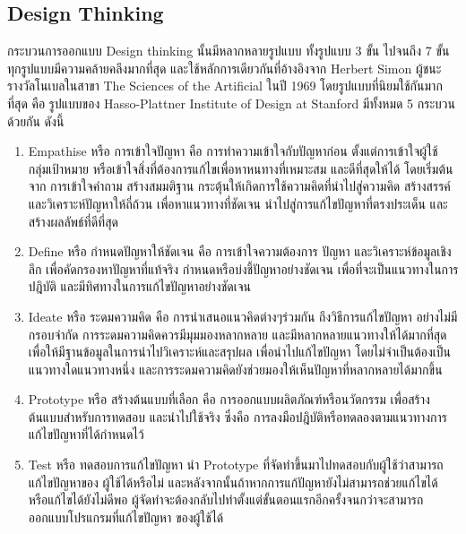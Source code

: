 \subsection{Design Thinking}
กระบวนการออกแบบ Design thinking นั้นมีหลากหลายรูปแบบ ทั้งรูปแบบ 3 ขั้น ไปจนถึง 7 ขั้น ทุกรูปแบบมีความคล้ายคลึงมากที่สุด และใช้หลักการเดียวกันที่อ้างอิงจาก Herbert Simon ผู้ชนะรางวัลโนเบลในสาขา The Sciences of the Artificial ในปี 1969 โดยรูปแบบที่นิยมใช้กันมากที่สุด คือ รูปแบบของ Hasso-Plattner Institute of Design at Stanford มีทั้งหมด 5 กระบวนด้วยกัน ดังนี้
\begin{enumerate}
    \item Empathise หรือ การเข้าใจปัญหา
          คือ การทำความเข้าใจกับปัญหาก่อน ตั้งแต่การเข้าใจผู้ใช้ กลุ่มเป้าหมาย หรือเข้าใจสิ่งที่ต้องการแก้ไขเพื่อหาหนทางที่เหมาะสม และดีที่สุดให้ได้ โดยเริ่มต้นจาก การเข้าใจคำถาม สร้างสมมติฐาน กระตุ้นให้เกิดการใช้ความคิดที่นำไปสู่ความคิด สร้างสรรค์ และวิเคราะห์ปัญหาให้ถี่ถ้วน เพื่อหาแนวทางที่ชัดเจน นำไปสู่การแก้ไขปัญหาที่ตรงประเด็น และสร้างผลลัพธ์ที่ดีที่สุด
    \item Define หรือ กำหนดปัญหาให้ชัดเจน
          คือ การเข้าใจความต้องการ ปัญหา และวิเคราะห์ข้อมูลเชิงลึก เพื่อคัดกรองหาปัญหาที่แท้จริง กำหนดหรือบ่งชี้ปัญหาอย่างชัดเจน เพื่อที่จะเป็นแนวทางในการปฎิบัติ และมีทิศทางในการแก้ไขปัญหาอย่างชัดเจน
    \item Ideate หรือ ระดมความคิด
          คือ การนำเสนอแนวคิดต่างๆร่วมกัน ถึงวิธีการแก้ไขปัญหา อย่างไม่มีกรอบจำกัด การระดมความคิดควรมีมุมมองหลากหลาย และมีหลากหลายแนวทางให้ได้มากที่สุด เพื่อให้มีฐานข้อมูลในการนำไปวิเคราะห์และสรุปผล เพื่อนำไปแก้ไขปัญหา โดยไม่จำเป็นต้องเป็นแนวทางใดแนวทางหนึ่ง และการระดมความคิดยังช่วยมองให้เห็นปัญหาที่หลากหลายได้มากขึ้น
    \item Prototype หรือ สร้างต้นแบบที่เลือก
          คือ การออกแบบผลิตภัณฑ์หรือนวัตกรรม เพื่อสร้างต้นแบบสำหรับการทดสอบ และนำไปใช้จริง ซึ่งคือ การลงมือปฎิบัติหรือทดลองตามแนวทางการแก้ไขปัญหาที่ได้กำหนดไว้
    \item Test หรือ ทดสอบการแก้ไขปัญหา นํา Prototype ที่จัดทําขึ้นมาไปทดสอบกับผู้ใช้ว่าสามารถแก้ไขปัญหาของ
          ผู้ใช้ได้หรือไม่ และหลังจากนั้นถ้าหากการแก้ปัญหายังไม่สามารถช่วยแก้ไขได้
          หรือแก้ไขได้ยังไม่ดีพอ ผู้จัดทําจะต้องกลับไปทําตั้งแต่ขั้นตอนแรกอีกครั้งจนกว่าจะสามารถออกแบบโปรแกรมที่แก้ไขปัญหา
          ของผู้ใช้ได้



\end{enumerate}
